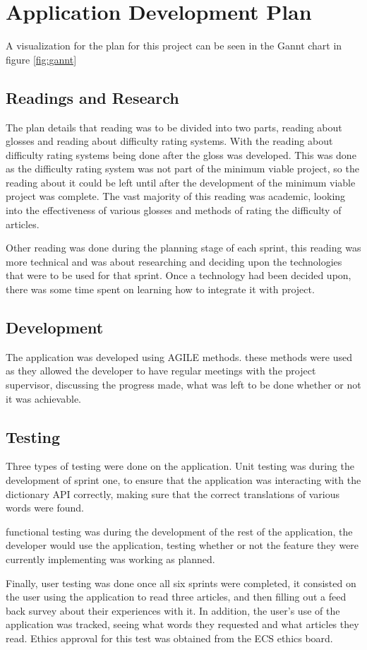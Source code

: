 \chapter{Application Development Plan}

A visualization for the plan for this project can be seen in the Gannt chart in figure \ref{fig:gannt}
 

\section{Readings and Research}

The plan details that reading was to be divided into two parts, reading about glosses and reading about difficulty rating systems. With the reading about difficulty rating systems being done after the gloss was developed. This was done as the difficulty rating system was not part of the minimum viable project, so the reading about it could be left until after the development of the minimum viable project was complete. The vast majority of this reading was academic, looking into the effectiveness of various glosses and methods of rating the difficulty of articles.

Other reading was done during the planning stage of each sprint, this reading was more technical and was about researching and deciding upon the technologies that were to be used for that sprint. Once a technology had been decided upon, there was some time spent on learning how to integrate it with project.


\section{Development}

The application was developed using AGILE methods. these methods were used as they allowed the developer to have regular meetings with the project supervisor, discussing the progress made, what was left to be done whether or not it was achievable.

\section{Testing}

Three types of testing were done on the application. Unit testing was during the development of sprint one, to ensure that the application was interacting with the dictionary API correctly, making sure that the correct translations of various words were found. 

functional testing was during the development of the rest of the application, the developer would use the application, testing whether or not the feature they were currently implementing was working as planned.

Finally, user testing was done once all six sprints were completed, it consisted on the user using the application to read three articles, and then filling out a feed back survey about their experiences with it. In addition, the user's use of the application was tracked, seeing what words they requested and what articles they read. Ethics approval for this test was obtained from the ECS ethics board. 